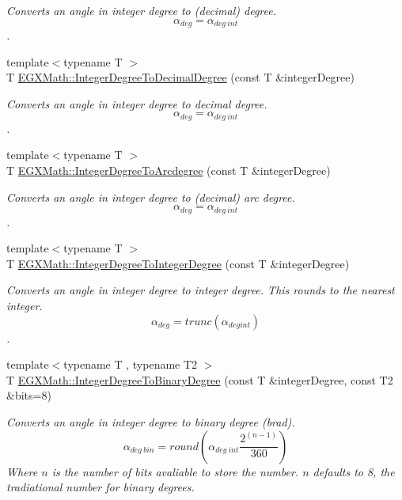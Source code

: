\begin{DoxyCompactItemize}
\begin{DoxyCompactList}\small\item\em Converts an angle in integer degree to (decimal) degree. \[\alpha_{deg}=\alpha_{deg\ int}\]. \end{DoxyCompactList}\item 
{\footnotesize template$<$typename T $>$ }\\T \mbox{\hyperlink{group___e_g_x_math-_angle_conversions-_integer_degree_gac219c3198508ba984d8d81d22831b27d}{E\+G\+X\+Math\+::\+Integer\+Degree\+To\+Decimal\+Degree}} (const T \&integer\+Degree)
\begin{DoxyCompactList}\small\item\em Converts an angle in integer degree to decimal degree. \[\alpha_{deg}=\alpha_{deg\ int}\]. \end{DoxyCompactList}\item 
{\footnotesize template$<$typename T $>$ }\\T \mbox{\hyperlink{group___e_g_x_math-_angle_conversions-_integer_degree_gaf633d0b82bfb7586ce86ffbcf78d8f7a}{E\+G\+X\+Math\+::\+Integer\+Degree\+To\+Arcdegree}} (const T \&integer\+Degree)
\begin{DoxyCompactList}\small\item\em Converts an angle in integer degree to (decimal) arc degree. \[\alpha_{deg}=\alpha_{deg\ int}\]. \end{DoxyCompactList}\item 
{\footnotesize template$<$typename T $>$ }\\T \mbox{\hyperlink{group___e_g_x_math-_angle_conversions-_integer_degree_gac9e870bdfa60dd2bb61469fdf6eedd7c}{E\+G\+X\+Math\+::\+Integer\+Degree\+To\+Integer\+Degree}} (const T \&integer\+Degree)
\begin{DoxyCompactList}\small\item\em Converts an angle in integer degree to integer degree. This rounds to the nearest integer. \[\alpha_{deg}=trunc(\alpha_{deg int})\]. \end{DoxyCompactList}\item 
{\footnotesize template$<$typename T , typename T2 $>$ }\\T \mbox{\hyperlink{group___e_g_x_math-_angle_conversions-_integer_degree_ga694bbfe624c3c14e97ce6155ca9bc44d}{E\+G\+X\+Math\+::\+Integer\+Degree\+To\+Binary\+Degree}} (const T \&integer\+Degree, const T2 \&bits=8)
\begin{DoxyCompactList}\small\item\em Converts an angle in integer degree to binary degree (brad). \[\alpha_{deg\ bin}=round(\alpha_{deg\ int}\frac{2^(n-1)}{360})\] Where $n$ is the number of bits avaliable to store the number. $n$ defaults to 8, the tradiational number for binary degrees. \end{DoxyCompactList}\item 

\end{DoxyCompactItemize}
